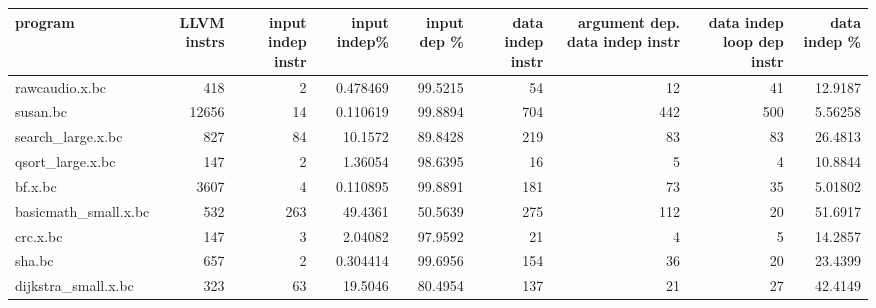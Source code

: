 \begin{table}[ht]
\centering
\begin{adjustbox}{width=1.3\textwidth}

\begin{tabular}{lrrrrrrrr}
\hline
 program              &   LLVM instrs &   input indep instr &   input indep\% &   input dep \% &   data indep instr &   argument dep. data indep instr &   data indep loop dep instr &   data indep \% \\
\hline
 rawcaudio.x.bc       &           418 &                   2 &      0.478469  &       99.5215 &                 54 &                               12 &                          41 &       12.9187  \\
 susan.bc             &         12656 &                  14 &      0.110619  &       99.8894 &                704 &                              442 &                         500 &        5.56258 \\
 search\_large.x.bc    &           827 &                  84 &     10.1572    &       89.8428 &                219 &                               83 &                          83 &       26.4813  \\
 qsort\_large.x.bc     &           147 &                   2 &      1.36054   &       98.6395 &                 16 &                                5 &                           4 &       10.8844  \\
 bf.x.bc              &          3607 &                   4 &      0.110895  &       99.8891 &                181 &                               73 &                          35 &        5.01802 \\
 basicmath\_small.x.bc &           532 &                 263 &     49.4361    &       50.5639 &                275 &                              112 &                          20 &       51.6917  \\
 crc.x.bc             &           147 &                   3 &      2.04082   &       97.9592 &                 21 &                                4 &                           5 &       14.2857  \\
 sha.bc               &           657 &                   2 &      0.304414  &       99.6956 &                154 &                               36 &                          20 &       23.4399  \\
 dijkstra\_small.x.bc  &           323 &                  63 &     19.5046    &       80.4954 &                137 &                               21 &                          27 &       42.4149  \\

\end{tabular}
\end{adjustbox}
\end{table}

